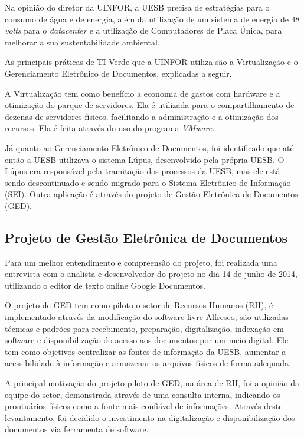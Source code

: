 Na opinião do diretor da UINFOR, a UESB precisa de estratégias para o consumo de água e de energia, além da utilização de um sistema de energia de 48 \textit{volts} para o \textit{datacenter} e a utilização de Computadores de Placa Única, para melhorar a sua sustentabilidade ambiental.

As principais práticas de TI Verde que a UINFOR utiliza são a Virtualização e o Gerenciamento Eletrônico de Documentos, explicadas a seguir.

A Virtualização tem como benefício a economia de gastos com hardware e a otimização do parque de servidores. Ela é utilizada para o compartilhamento de dezenas de servidores físicos, facilitando a administração e a otimização dos recursos. Ela é feita através do uso do programa \textit{VMware}. 

Já quanto ao Gerenciamento Eletrônico de Documentos, foi identificado que até então a UESB utilizava o sistema Lúpus, desenvolvido pela própria UESB. O Lúpus era responsável pela tramitação dos processos da UESB, mas ele está sendo descontinuado e sendo migrado para o Sistema Eletrônico de Informação (SEI). Outra aplicação é através do projeto de Gestão Eletrônica de Documentos (GED).

\subsection{Projeto de Gestão Eletrônica de Documentos}

Para um melhor entendimento e compreensão do projeto, foi realizada uma entrevista com o analista e desenvolvedor do projeto no dia 14 de junho de 2014, utilizando o editor de texto online Google Documentos.

O projeto de GED tem como piloto o setor de Recursos Humanos (RH), é implementado através da modificação do software livre Alfresco, são utilizadas técnicas e padrões para recebimento, preparação, digitalização, indexação em software e disponibilização do acesso aos documentos por um meio digital. Ele tem como objetivos centralizar as fontes de informação da UESB, aumentar a acessibilidade à informação e armazenar os arquivos físicos de forma adequada.

A principal motivação do projeto piloto de GED, na área de RH, foi a opinião da equipe do setor, demonstrada através de uma consulta interna, indicando os prontuários físicos como a fonte mais confiável de informações. Através deste levantamento, foi decidido o investimento na digitalização e disponibilização dos documentos via ferramenta de software.

